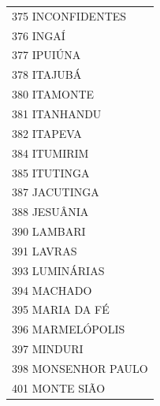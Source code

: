 \documentclass{article}
\begin{document}
\begin{longtable}[c]{m{18cm}}
\multicolumn{1}{l}{ \hspace{2em} 375 INCONFIDENTES } \\
\multicolumn{1}{l}{ \hspace{2em} 376 INGAÍ } \\
\multicolumn{1}{l}{ \hspace{2em} 377 IPUIÚNA } \\
\multicolumn{1}{l}{ \hspace{2em} 378 ITAJUBÁ } \\
\multicolumn{1}{l}{ \hspace{2em} 380 ITAMONTE } \\
\multicolumn{1}{l}{ \hspace{2em} 381 ITANHANDU } \\
\multicolumn{1}{l}{ \hspace{2em} 382 ITAPEVA } \\
\multicolumn{1}{l}{ \hspace{2em} 384 ITUMIRIM } \\
\multicolumn{1}{l}{ \hspace{2em} 385 ITUTINGA } \\
\multicolumn{1}{l}{ \hspace{2em} 387 JACUTINGA } \\
\multicolumn{1}{l}{ \hspace{2em} 388 JESUÂNIA } \\
\multicolumn{1}{l}{ \hspace{2em} 390 LAMBARI } \\
\multicolumn{1}{l}{ \hspace{2em} 391 LAVRAS } \\
\multicolumn{1}{l}{ \hspace{2em} 393 LUMINÁRIAS } \\
\multicolumn{1}{l}{ \hspace{2em} 394 MACHADO } \\
\multicolumn{1}{l}{ \hspace{2em} 395 MARIA DA FÉ } \\
\multicolumn{1}{l}{ \hspace{2em} 396 MARMELÓPOLIS } \\
\multicolumn{1}{l}{ \hspace{2em} 397 MINDURI } \\
\multicolumn{1}{l}{ \hspace{2em} 398 MONSENHOR PAULO } \\
\multicolumn{1}{l}{ \hspace{2em} 401 MONTE SIÃO } \\

\end{longtable}
\end{document}
